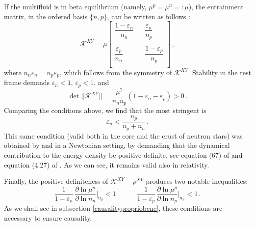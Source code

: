\documentclass[a4paper, amsfonts, amssymb, amsmath, reprint, showkeys, nofootinbib, twoside, onecolumn,notitlepage]{revtex4-1}
\newcommand{\spc}{\quad \quad \quad}
\theoremstyle{definition}
\theoremstyle{theorem}
\begin{document}
If the multifluid is in beta equilibrium (namely, $\mu^p = \mu^n =: \mu$), the entrainment matrix, in the ordered basis $\{ n,p \}$, can be written as follows \cite{antonelli+2018}:
\begin{equation}
\mathcal{K}^{XY}=\mu 
\begin{bmatrix}
   \dfrac{1-\varepsilon_n}{n_n} &  & \dfrac{\varepsilon_n }{n_p}  \\
   & & \\
   \dfrac{\varepsilon_p}{n_n}  & & \dfrac{1-\varepsilon_p}{n_p}  \\
\end{bmatrix} \, ,
\end{equation} 
where $n_n \varepsilon_n = n_p \varepsilon_p$, which follows from the symmetry of $\mathcal{K}^{XY}$. Stability in the rest frame demands $\varepsilon_n <1$, $\varepsilon_p <1$, and
\begin{equation}
\det || \mathcal{K}^{XY} || =  \dfrac{\mu^2}{n_n n_p} (1-\varepsilon_n - \varepsilon_p) >0 \, .
\end{equation}
Comparing the conditions above, we find that the most stringent is
\begin{equation}
\varepsilon_n < \dfrac{n_p}{n_p+n_n} \, .
\end{equation}
This same condition (valid both in the core and the crust of neutron stars) was obtained by \citet{chamelhaensel2006} and \citet{carter_macro_2006} in a Newtonian setting, by demanding that the dynamical contribution to the energy density be positive definite, see equation (67) of \cite{chamelhaensel2006} and equation (4.27) of \cite{carter_macro_2006}. As we can see, it remains valid also in relativity.

Finally, the positive-definiteness of $\mathcal{K}^{XY}-\rho^{XY}$ produces two notable inequalities:
\begin{equation}
\dfrac{1}{1-\varepsilon_n} \, \dfrac{\partial \ln \mu^n}{\partial  \ln n_n}\bigg|_{n_p} <1 \spc \dfrac{1}{1-\varepsilon_p} \, \dfrac{\partial \ln \mu^p}{\partial  \ln n_p}\bigg|_{n_n} <1 \, . 
\end{equation}
As we shall see in subsection \ref{causalitypropriobene}, these conditions are necessary to ensure causality.
\end{document}
